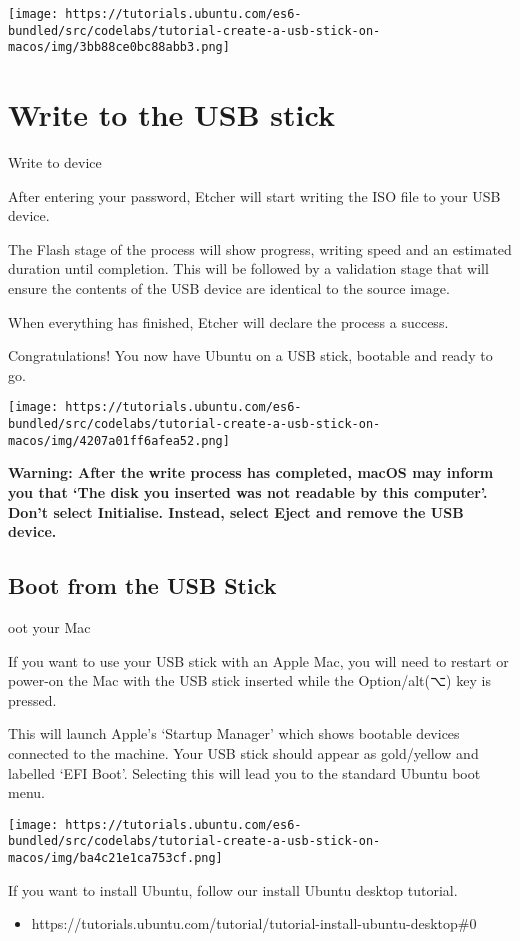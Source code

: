 \texttt{[image: https://tutorials.ubuntu.com/es6-bundled/src/codelabs/tutorial-create-a-usb-stick-on-macos/img/3bb88ce0bc88abb3.png]}

\hypertarget{write-to-the-usb-stick}{%
\section{Write to the USB stick}\label{write-to-the-usb-stick}}

Write to device

After entering your password, Etcher will start writing the ISO file to
your USB device.

The Flash stage of the process will show progress, writing speed and an
estimated duration until completion. This will be followed by a
validation stage that will ensure the contents of the USB device are
identical to the source image.

When everything has finished, Etcher will declare the process a success.

Congratulations! You now have Ubuntu on a USB stick, bootable and ready
to go.

\texttt{[image: https://tutorials.ubuntu.com/es6-bundled/src/codelabs/tutorial-create-a-usb-stick-on-macos/img/4207a01ff6afea52.png]}

\textbf{Warning: After the write process has completed, macOS may inform
you that `The disk you inserted was not readable by this computer'.
Don't select Initialise. Instead, select Eject and remove the USB
device.}

\hypertarget{boot-from-the-usb-stick}{%
\subsection{Boot from the USB Stick}\label{boot-from-the-usb-stick}}

oot your Mac

If you want to use your USB stick with an Apple Mac, you will need to
restart or power-on the Mac with the USB stick inserted while the
Option/alt(⌥) key is pressed.

This will launch Apple's `Startup Manager' which shows bootable devices
connected to the machine. Your USB stick should appear as gold/yellow
and labelled `EFI Boot'. Selecting this will lead you to the standard
Ubuntu boot menu.

\texttt{[image: https://tutorials.ubuntu.com/es6-bundled/src/codelabs/tutorial-create-a-usb-stick-on-macos/img/ba4c21e1ca753cf.png]}

If you want to install Ubuntu, follow our install Ubuntu desktop
tutorial.

\begin{itemize}
\tightlist
\item
  https://tutorials.ubuntu.com/tutorial/tutorial-install-ubuntu-desktop\#0
\end{itemize}
